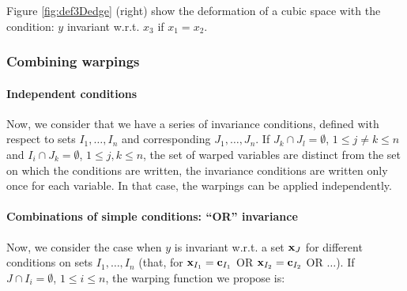 Figure \ref{fig:def3Dedge} (right) show the deformation of a cubic space with the condition: $y$ invariant w.r.t. $x_3$ if $x_1 = x_2$. 

\subsubsection{Combining warpings}

\paragraph{Independent conditions}
Now, we consider that we have a series of invariance conditions, defined with respect to sets $I_1, \ldots, I_n$ and corresponding $J_1, \ldots, J_n$.
If $J_k\cap J_l=\emptyset$, $1 \leq j\neq k \leq n$ and $I_i\cap J_k = \emptyset$,  $1 \leq j,k \leq n$,
the set of warped variables are distinct from the set on which the conditions are written, 
the invariance conditions are written only once for each variable. In that case, 
the warpings can be applied independently.

\paragraph{Combinations of simple conditions: ``OR'' invariance}
Now, we consider the case when $y$ is invariant w.r.t. a set $\mathbf{x}_J$ for different conditions on sets $I_1, \ldots, I_n$
(that, for $\mathbf{x}_{I_1}=\mathbf{c}_{I_1}$ OR $\mathbf{x}_{I_2}=\mathbf{c}_{I_2}$ OR $\ldots$).
If $J\cap I_i=\emptyset$, $1 \leq i \leq n$, the warping function we propose is:

